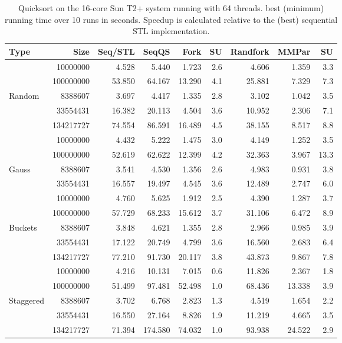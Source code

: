 \documentclass[preprint]{sigplanconf}
\begin{document}
\begin{table*}[t!]
\begin{center}
\begin{tabular}{|lr|rr|rrr||rr|}
\hline
Type & Size & Seq/STL & SeqQS & Fork & SU & Randfork & MMPar & SU \\
\hline
 & 10000000 & 4.528 & 5.440 & 1.723 & 2.6 & 4.606 & 1.359 & 3.3 \\
 & 100000000 & 53.850 & 64.167 & 13.290 & 4.1 & 25.881 & 7.329 & 7.3 \\
Random & 8388607 & 3.697 & 4.417 & 1.335 & 2.8 & 3.102 & 1.042 & 3.5 \\
 & 33554431 & 16.382 & 20.113 & 4.504 & 3.6 & 10.952 & 2.306 & 7.1 \\
 & 134217727 & 74.554 & 86.591 & 16.489 & 4.5 & 38.155 & 8.517 & 8.8 \\
\hline
 & 10000000 & 4.432 & 5.222 & 1.475 & 3.0 & 4.149 & 1.252 & 3.5 \\
 & 100000000 & 52.619 & 62.622 & 12.399 & 4.2 & 32.363 & 3.967 & 13.3 \\
Gauss & 8388607 & 3.541 & 4.530 & 1.356 & 2.6 & 4.983 & 0.931 & 3.8 \\
 & 33554431 & 16.557 & 19.497 & 4.545 & 3.6 & 12.489 & 2.747 & 6.0 \\
\hline
 & 10000000 & 4.760 & 5.625 & 1.912 & 2.5 & 4.390 & 1.287 & 3.7 \\
 & 100000000 & 57.729 & 68.233 & 15.612 & 3.7 & 31.106 & 6.472 & 8.9 \\
Buckets & 8388607 & 3.848 & 4.621 & 1.355 & 2.8 & 2.966 & 0.985 & 3.9 \\
 & 33554431 & 17.122 & 20.749 & 4.799 & 3.6 & 16.560 & 2.683 & 6.4 \\
 & 134217727 & 77.210 & 91.730 & 20.117 & 3.8 & 43.873 & 9.867 & 7.8 \\
\hline
 & 10000000 & 4.216 & 10.131 & 7.015 & 0.6 & 11.826 & 2.367 & 1.8 \\
 & 100000000 & 51.499 & 97.481 & 52.498 & 1.0 & 68.436 & 13.338 & 3.9 \\
Staggered & 8388607 & 3.702 & 6.768 & 2.823 & 1.3 & 4.519 & 1.654 & 2.2 \\
 & 33554431 & 16.550 & 27.164 & 8.826 & 1.9 & 11.219 & 4.665 & 3.5 \\
 & 134217727 & 71.394 & 174.580 & 74.032 & 1.0 & 93.938 & 24.522 & 2.9 \\
\hline
\end{tabular}
\end{center}
\caption{Quicksort on the 16-core Sun T2+ system running with 64 threads. 
best (minimum) running time over 10 runs in seconds.
Speedup is calculated relative to the (best) sequential STL implementation.}
\label{tab:sort_t2_64_min}
\end{table*}
\end{document}
